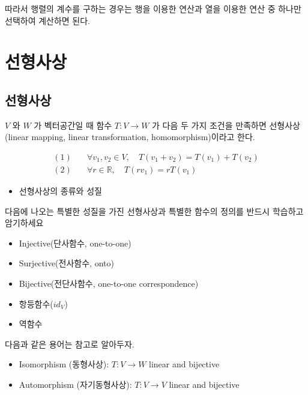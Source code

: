\documentclass[
  11pt,
  a4paper,
  oneside]{scrbook}
\providecommand{\tightlist}{%
  \setlength{\itemsep}{0pt}\setlength{\parskip}{0pt}}\usepackage{longtable,booktabs,array}
\newcommand{\RR}{\mathbb{R}}
\theoremstyle{definition}
\theoremstyle{definition}
\theoremstyle{plain}
\theoremstyle{remark}
\begin{document}
따라서 행렬의 계수를 구하는 경우는 행을 이용한 연산과 열을 이용한 연산
중 하나만 선택하여 계산하면 된다.


\chapter{선형사상}\label{linear_map}

\section{선형사상}\label{uxc120uxd615uxc0acuxc0c1}

\(V\) 와 \(W\) 가 벡터공간일 때 함수 \(T :V \rightarrow W\) 가 다음 두
가지 조건을 만족하면 선형사상(linear mapping, linear transformation,
homomorphism)이라고 한다.

\[
\begin{aligned}
(1) & \quad \forall v_1, v_2 \in V, \quad T(v_1 + v_2) = T(v_1) + T(v_2) \\
(2) & \quad \forall r \in \RR, \quad T(rv_1) = r T(v_1)
\end{aligned}
\]

\begin{itemize}
\tightlist
\item
  선형사상의 종류와 성질
\end{itemize}

다음에 나오는 특별한 성질을 가진 선형사상과 특별한 함수의 정의를 반드시
학습하고 암기하세요

\begin{itemize}
\tightlist
\item
  Injective(단사함수, one-to-one)
\item
  Surjective(전사함수, onto)
\item
  Bijective(전단사함수, one-to-one correspondence)
\item
  항등함수(\(id_V\))
\item
  역함수
\end{itemize}

다음과 같은 용어는 참고로 알아두자.

\begin{itemize}
\tightlist
\item
  Isomorphism (동형사상): \(T : V \rightarrow W\) linear and bijective
\item
  Automorphism (자기동형사상): \(T : V \rightarrow V\) linear and
  bijective
\end{itemize}
\end{document}
